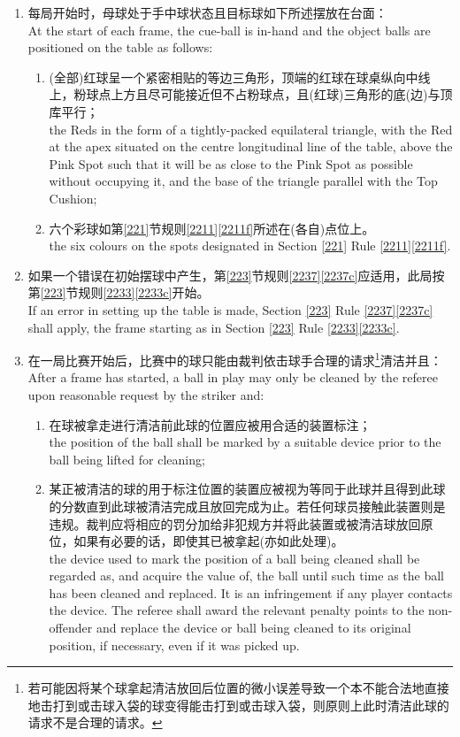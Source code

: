 \begin{enumerate}[label=(\alph*)]
    \item 每局开始时，母球处于手中球状态且目标球如下所述摆放在台面：\\
    At the start of each frame, the cue-ball is in-hand and the object balls are positioned on the table as follows:
    \begin{enumerate}[label=(\roman*)]
        \item (全部)红球呈一个紧密相贴的等边三角形，顶端的红球在球桌纵向中线上，粉球点上方且尽可能接近但不占粉球点，且(红球)三角形的底(边)与顶库平行；\\
        the Reds in the form of a tightly-packed equilateral triangle, with the Red at the apex situated on the centre longitudinal line of the table, above the Pink Spot such that it will be as close to the Pink Spot as possible without occupying it, and the base of the triangle parallel with the Top Cushion;
        \item 六个彩球如第\ref{221}节规则\ref{2211}\ref{2211f}所述在(各自)点位上。\\
        the six colours on the spots designated in Section \ref{221} Rule \ref{2211}\ref{2211f}.
    \end{enumerate}
    \item 如果一个错误在初始摆球中产生，第\ref{223}节规则\ref{2237}\ref{2237c}应适用，此局按第\ref{223}节规则\ref{2233}\ref{2233c}开始。\\
    If an error in setting up the table is made, Section \ref{223} Rule \ref{2237}\ref{2237c} shall apply, the frame starting as in Section \ref{223} Rule \ref{2233}\ref{2233c}.
    \item \label{2232c}在一局比赛开始后，比赛中的球只能由裁判依击球手合理的请求\footnote{若可能因将某个球拿起清洁放回后位置的微小误差导致一个本不能合法地直接地击打到或击球入袋的球变得能击打到或击球入袋，则原则上此时清洁此球的请求不是合理的请求。}清洁并且：\\
    After a frame has started, a ball in play may only be 
    cleaned by the referee upon reasonable request by 
    the striker and:
    \begin{enumerate}[label=(\roman*)]
        \item 在球被拿走进行清洁前此球的位置应被用合适的装置标注；\\
        the position of the ball shall be marked by a suitable device prior to the ball being lifted for cleaning;
        \item \label{2232cii}某正被清洁的球的用于标注位置的装置应被视为等同于此球并且得到此球的分数直到此球被清洁完成且放回完成为止。若任何球员接触此装置则是违规。裁判应将相应的罚分加给非犯规方并将此装置或被清洁球放回原位，如果有必要的话，即使其已被拿起(亦如此处理)。\\
        the device used to mark the position of a ball being cleaned shall be regarded as, and acquire the value of, the ball until such time as the ball has been cleaned and replaced. It is an infringement if any player contacts the device. The referee shall award the relevant penalty points to the non-offender and replace the device or ball being cleaned to its original position, if necessary, even if it was picked up.
    

\end{enumerate}
\end{enumerate}
